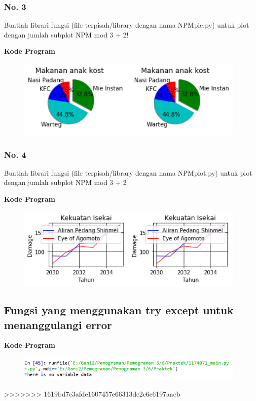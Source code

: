\subsubsection{No. 3}
\hfill \break
Buatlah librari fungsi (file terpisah/library dengan nama NPMpie.py) untuk plot dengan jumlah subplot NPM mod 3 + 2!

\hfill \break
\textbf{Kode Program}



\begin{figure}[H]
	\includegraphics[width=12cm]{figures/6/1174071/Praktek/piepraktek.png}
	\centering
\end{figure}

\subsubsection{No. 4}
\hfill \break
Buatlah librari fungsi (file terpisah/library dengan nama NPMplot.py) untuk plot dengan jumlah subplot NPM mod 3 + 2

\hfill \break
\textbf{Kode Program}



\begin{figure}[H]
	\includegraphics[width=12cm]{figures/6/1174071/Praktek/plotpraktek.png}
	\centering
\end{figure}

\subsection{Fungsi yang menggunakan try except untuk menanggulangi error}

\hfill \break
\textbf{Kode Program}



\begin{figure}[H]
	\includegraphics[width=12cm]{figures/6/1174071/Praktek/errorpraktek.png}
	\centering
\end{figure}
>>>>>>> 1619bd7c3afde1607457e66313de2c6e6197aaeb
